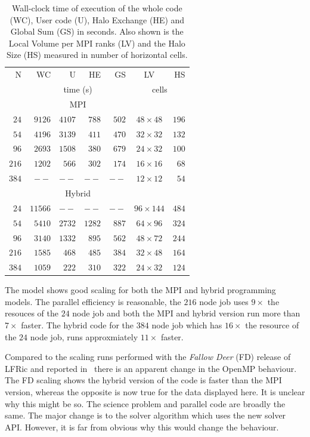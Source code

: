 \begin{table}
\centering
\caption{\label{tab:scale-data}Wall-clock time of execution of the whole code (WC), User
  code (U), Halo Exchange (HE) and Global Sum (GS) in seconds. Also
  shown is the Local Volume per MPI ranks (LV) and the Halo Size (HS)
  measured in number of horizontal cells.}
\begin{tabular}{r|rrrr|cr}
N & WC & U & HE & GS & LV & HS  \\
    & \multicolumn{4}{c|}{time (s)} & \multicolumn{2}{c}{cells} \\ \hline\hline
     &  \multicolumn{4}{c|}{MPI}& \\
$24$  & $9126$ & $4107$ & $788$ & $502$ & $48\times 48$ & $196$ \\
$54$  & $4196$ & $3139$ & $411$ & $470$ & $32\times 32$ & $132$ \\ 
$96$  & $2693$ & $1508$ & $380$ & $679$ & $24\times 32$ & $100$ \\ 
$216$ & $1202$ & $566$  & $302$ & $174$ & $16\times 16$ & $68$  \\ 
$384$ & $--$   & $--$   & $--$  & $--$  & $12\times 12$ & $54$ \\\hline
  & \multicolumn{4}{c|}{Hybrid} & \\
$24$ &$11566$ & $--$    & $--$  & $--$ & $96\times 144$ & $484$ \\
$54$ & $5410$  & $2732$ & $1282$ & $887$ & $64\times 96$ & $324$ \\
$96$ &$3140$  & $1332$ & $895$ & $562$ & $48\times 72$ & $244$ \\
$216$ &$1585$  & $468$ & $485$ & $384$ & $32\times 48$ & $164$ \\
$384$ &$1059$  & $222$ & $310$ & $322$ & $24\times 32$ & $124$ \\\hline
\end{tabular}
\end{table}

The model shows good scaling for both the MPI and hybrid programming
models. The parallel efficiency is reasonable, the $216$ node job uses
$9\times $ the resouces of the $24$ node job and both the MPI and
hybrid version run more than $7\times $ faster. The hybrid code for the
$384$ node job which has $16\times $ the resource of the $24$ node
job, runs approxmiately $11 \times$ faster.

Compared to the scaling runs performed with the {\em Fallow Deer} (FD)
release of LFRic and reported in~\cite{LFRic} there is an apparent
change in the OpenMP behaviour. The FD scaling shows the hybrid version of
the code is faster than the MPI version, whereas the opposite is now
true for the data displayed here. It is unclear why this might be
so. The science problem and parallel code are broadly the same. The
major change is to the solver algorithm which uses the new solver
API. However, it is far from obvious why this would change the
behaviour.

